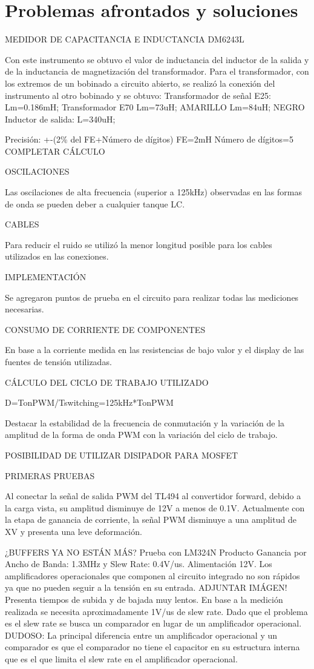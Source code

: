 \section{Problemas afrontados y soluciones}

MEDIDOR DE CAPACITANCIA E INDUCTANCIA DM6243L

Con este instrumento se obtuvo el valor de inductancia del inductor de la salida y de la inductancia de magnetización del transformador. 
Para el transformador, con los extremos de un bobinado a circuito abierto, se realizó la conexión del instrumento al otro bobinado y se obtuvo:
Transformador de señal E25:
Lm=0.186mH; 
Transformador E70
Lm=73uH; AMARILLO 
Lm=84uH; NEGRO
Inductor de salida:
L=340uH;

Precisión: +-(2\% del FE+Número de dígitos)
FE=2mH
Número de dígitos=5
COMPLETAR CÁLCULO 

OSCILACIONES

Las oscilaciones de alta frecuencia (superior a 125kHz) observadas en las formas de onda se pueden deber a cualquier tanque LC. 

CABLES

Para reducir el ruido se utilizó la menor longitud posible para los cables utilizados en las conexiones. 

IMPLEMENTACIÓN

Se agregaron puntos de prueba en el circuito para realizar todas las mediciones necesarias. 

CONSUMO DE CORRIENTE DE COMPONENTES 

En base a la corriente medida en las resistencias de bajo valor y el display de las fuentes de tensión utilizadas. 

CÁLCULO DEL CICLO DE TRABAJO UTILIZADO 

D=TonPWM/Tswitching=125kHz*TonPWM

Destacar la estabilidad de la frecuencia de conmutación y la variación de la amplitud de la forma de onda PWM con la variación del ciclo de trabajo. 

POSIBILIDAD DE UTILIZAR DISIPADOR PARA MOSFET

PRIMERAS PRUEBAS

Al conectar la señal de salida PWM del TL494 al convertidor forward, debido a la carga vista, su amplitud disminuye de 12V a menos de 0.1V. 
Actualmente con la etapa de ganancia de corriente, la señal PWM disminuye a una amplitud de XV y presenta una leve deformación.

¿BUFFERS YA NO ESTÁN MÁS?
Prueba con LM324N
Producto Ganancia por Ancho de Banda: 1.3MHz y Slew Rate: 0.4V/us. 
Alimentación 12V. Los amplificadores operacionales que componen al circuito integrado no son rápidos ya que no pueden seguir a la tensión en su entrada. 
ADJUNTAR IMÁGEN!
Presenta tiempos de subida y de bajada muy lentos. En base a la medición realizada se necesita aproximadamente 1V/us de slew rate. 
Dado que el problema es el slew rate se busca un comparador en lugar de un amplificador operacional. 
DUDOSO:
La principal diferencia entre un amplificador operacional y un comparador es que el comparador
 no tiene el capacitor en su estructura interna que es el que limita el slew rate en el amplificador operacional. 

